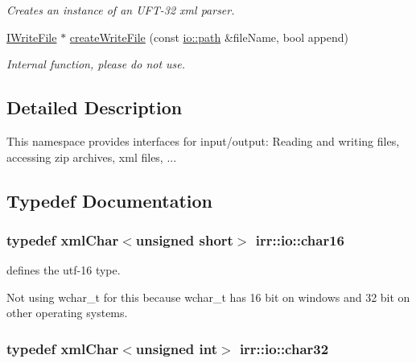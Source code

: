 \begin{DoxyCompactItemize}
\begin{DoxyCompactList}\small\item\em Creates an instance of an U\+F\+T-\/32 xml parser. \end{DoxyCompactList}\item 
\hyperlink{classirr_1_1io_1_1IWriteFile}{I\+Write\+File} $\ast$ \hyperlink{namespaceirr_1_1io_a5dec825b7f68ec19b252c9502ef501ec}{create\+Write\+File} (const \hyperlink{namespaceirr_1_1io_ab1bdc45edb3f94d8319c02bc0f840ee1}{io\+::path} \&file\+Name, bool append)\hypertarget{namespaceirr_1_1io_a5dec825b7f68ec19b252c9502ef501ec}{}\label{namespaceirr_1_1io_a5dec825b7f68ec19b252c9502ef501ec}

\begin{DoxyCompactList}\small\item\em Internal function, please do not use. \end{DoxyCompactList}\end{DoxyCompactItemize}


\subsection{Detailed Description}
This namespace provides interfaces for input/output\+: Reading and writing files, accessing zip archives, xml files, ... 

\subsection{Typedef Documentation}
\subsubsection[{\texorpdfstring{char16}{char16}}]{\setlength{\rightskip}{0pt plus 5cm}typedef {\bf xml\+Char}$<$unsigned short$>$ {\bf irr\+::io\+::char16}}\hypertarget{namespaceirr_1_1io_a9140fe380f1a4e2fb4e114463e2d2838}{}\label{namespaceirr_1_1io_a9140fe380f1a4e2fb4e114463e2d2838}


defines the utf-\/16 type. 

Not using wchar\+\_\+t for this because wchar\+\_\+t has 16 bit on windows and 32 bit on other operating systems. 
\subsubsection[{\texorpdfstring{char32}{char32}}]{\setlength{\rightskip}{0pt plus 5cm}typedef {\bf xml\+Char}$<$unsigned int$>$ {\bf irr\+::io\+::char32}}\hypertarget{namespaceirr_1_1io_adfbb5748d02235670728f95ab89b69a4}{}\label{namespaceirr_1_1io_adfbb5748d02235670728f95ab89b69a4}


